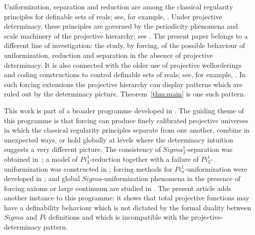 \documentclass{article}
\theoremstyle{remark}
\theoremstyle{plain}
\def\mathbf#1{#1}%
\def\Pi{Pi}%
\def\Sigma{Sigma}%
\begin{document}
Uniformization, separation and reduction are among the classical regularity
principles for definable sets of reals; see, for example,
\cite{Lusin,Moschovakis2,Kechris,Moschovakis}. Under projective determinacy,
these principles are governed by the periodicity phenomena and scale machinery
of the projective hierarchy; see \cite{martin1989proof,kechris2008games}. The
present paper belongs to a different line of investigation: the study, by
forcing, of the possible behaviour of uniformization, reduction and separation
in the absence of projective determinacy. It is also connected with the older
use of projective wellorderings and coding constructions to control definable
sets of reals; see, for example,
\cite{Addison,Harrington,CS,friedman2003universally}. In such forcing
extensions the projective hierarchy can display patterns which are ruled out by
the determinacy picture. Theorem~\ref{thm:main} is one such pattern.

This work is part of a broader programme developed in
\cite{H,HOFFELNER2023103292,hoffelner2022forcingpi1nuniformizationproperty,
BPFA_and_global_Sigma-uniformization,HoffelnerForcingAxiomsUniformization2024,
HoffelnerFailureReductionSeparation2023,HoffelnerLargeContinuumGlobalSigma2025}.
The guiding theme of this programme is that forcing can produce finely
calibrated projective universes in which the classical regularity principles
separate from one another, combine in unexpected ways, or hold globally at
levels where the determinacy intuition suggests a very different picture. The
consistency of $\mathbf{\Sigma}^1_3$-separation was obtained in~\cite{H}; a
model of $\mathbf{\Pi}^1_3$-reduction together with a failure of
$\mathbf{\Pi}^1_3$-uniformization was constructed in
\cite{HOFFELNER2023103292}; forcing methods for
$\mathbf{\Pi}^1_n$-uniformization were developed in
\cite{hoffelner2022forcingpi1nuniformizationproperty}; and global
$\Sigma$-uniformization phenomena in the presence of forcing axioms or large
continuum are studied in
\cite{BPFA_and_global_Sigma-uniformization,
HoffelnerForcingAxiomsUniformization2024,HoffelnerLargeContinuumGlobalSigma2025,
hoffelner2025forcinguppersigmauniformizationpresence}. The present article
adds another instance to this programme: it shows that total projective
functions may have a definability behaviour which is not dictated by the
formal duality between $\Sigma$ and $\Pi$ definitions and which is incompatible
with the projective-determinacy pattern.
\end{document}
